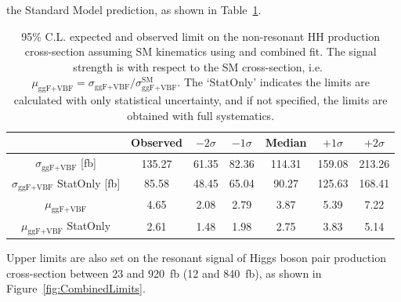 \documentclass[twoside,11pt]{report}
\begin{document}
    the Standard Model prediction, as shown in Table~\ref{sec:fit:tab:SMCombinedLimits}.
    \begin{table}[htbp]
    \centering
    \begin{tabular}{|c|c|c|c|c|c|c|}
    \hline
    & Observed & $-2\sigma$ & $-1\sigma$ & Median & $+1\sigma$ & $+2\sigma$\\
    \hline
    $\sigma_\text{ggF+VBF}$ [fb] & 135.27   & 61.35  &   82.36  &   114.31   &   159.08  &   213.26 \\ 
    \hline
    $\sigma_\text{ggF+VBF}$ StatOnly [fb] & 85.58  &    48.45  &   65.04  &  90.27  &   125.63  &   168.41 \\ 
    \hline
    $\mu_\text{ggF+VBF}$ & 4.65  &     2.08   &    2.79   &    3.87  &    5.39  &    7.22 \\ 
    \hline
    $\mu_\text{ggF+VBF}$ StatOnly & 2.61   &    1.48   &    1.98   &    2.75   &    3.83  &    5.14 \\ 
    \hline
    \end{tabular}
    \caption{95\% C.L. expected and observed limit on the non-resonant HH production cross-section 
    assuming SM kinematics using \lephad and \hadhad combined fit.
    The signal strength is with respect to the 
    SM cross-section, i.e.\ 
    $\mu_\text{ggF+VBF}=\sigma_\text{ggF+VBF}/\sigma_\text{ggF+VBF}^\text{SM}$.
    The `StatOnly' indicates the limits are calculated with only statistical uncertainty,
    and if not specified, the limits are obtained with full systematics.}
    \label{sec:fit:tab:SMCombinedLimits}
    \end{table}

    Upper limits are also set on the resonant signal of Higgs boson pair production 
    cross-section between 23 and 920~fb (12 and 840~fb),
    as shown in Figure~\ref{fig:CombinedLimits}.
    \newline
\end{document}
